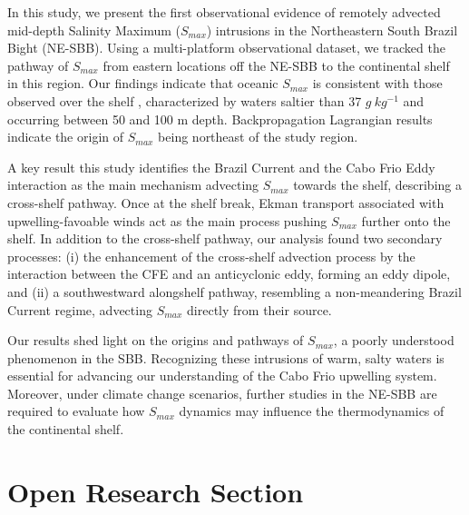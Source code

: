 \documentclass[draft]{agujournal2019}
\begin{document}
In this study, we present the first observational evidence of remotely advected mid-depth Salinity Maximum (\textit{$S_{max}$}) intrusions in the Northeastern South Brazil Bight (NE-SBB). Using a multi-platform observational dataset, we tracked the pathway of \textit{$S_{max}$} from eastern locations off the NE-SBB to the continental shelf in this region. Our findings indicate that oceanic \textit{$S_{max}$} is consistent with those observed over the shelf \cite{silva2023inventory}, characterized by waters saltier than 37 $g\ kg^{-1}$ and occurring between 50 and 100 m depth. Backpropagation Lagrangian results indicate the origin of \textit{$S_{max}$} being northeast of the study region. 

A key result this study identifies the Brazil Current and the Cabo Frio Eddy interaction as the main mechanism advecting \textit{$S_{max}$} towards the shelf, describing a cross-shelf pathway. Once at the shelf break, Ekman transport associated with upwelling-favoable winds act as the main process pushing \textit{$S_{max}$} further onto the shelf. In addition to the cross-shelf pathway, our analysis found two secondary processes: (i) the enhancement of the cross-shelf advection process by the interaction between the CFE and an anticyclonic eddy, forming an eddy dipole, and (ii) a southwestward alongshelf pathway, resembling a non-meandering Brazil Current regime, advecting \textit{$S_{max}$} directly from their source.

Our results shed light on the origins and pathways of \textit{$S_{max}$}, a poorly understood phenomenon in the SBB. Recognizing these intrusions of warm, salty waters is essential for advancing our understanding of the Cabo Frio upwelling system. Moreover, under climate change scenarios, further studies in the NE-SBB are required to evaluate how \textit{$S_{max}$} dynamics may influence the thermodynamics of the continental shelf.

%
%

\section*{Open Research Section}
\end{document}
